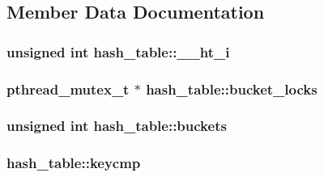 \subsection{Member Data Documentation}
\subsubsection[{\texorpdfstring{\+\_\+\+\_\+ht\+\_\+i}{__ht_i}}]{\setlength{\rightskip}{0pt plus 5cm}unsigned int hash\+\_\+table\+::\+\_\+\+\_\+ht\+\_\+i}\hypertarget{structhash__table_a77da69e21124ac1097627ae23ae72ef5}{}\label{structhash__table_a77da69e21124ac1097627ae23ae72ef5}
\subsubsection[{\texorpdfstring{bucket\+\_\+locks}{bucket_locks}}]{\setlength{\rightskip}{0pt plus 5cm}pthread\+\_\+mutex\+\_\+t $\ast$ hash\+\_\+table\+::bucket\+\_\+locks}\hypertarget{structhash__table_a4148c7a0d18b24d1c2961564dc0e7e7a}{}\label{structhash__table_a4148c7a0d18b24d1c2961564dc0e7e7a}
\subsubsection[{\texorpdfstring{buckets}{buckets}}]{\setlength{\rightskip}{0pt plus 5cm}unsigned int hash\+\_\+table\+::buckets}\hypertarget{structhash__table_a4678419b52c36e8b949b17eb4843a420}{}\label{structhash__table_a4678419b52c36e8b949b17eb4843a420}
\subsubsection[{\texorpdfstring{keycmp}{keycmp}}]{ hash\+\_\+table\+::keycmp}\hypertarget{structhash__table_a9465a319f391f0a50a4a84362c40fe48}{}\label{structhash__table_a9465a319f391f0a50a4a84362c40fe48}
